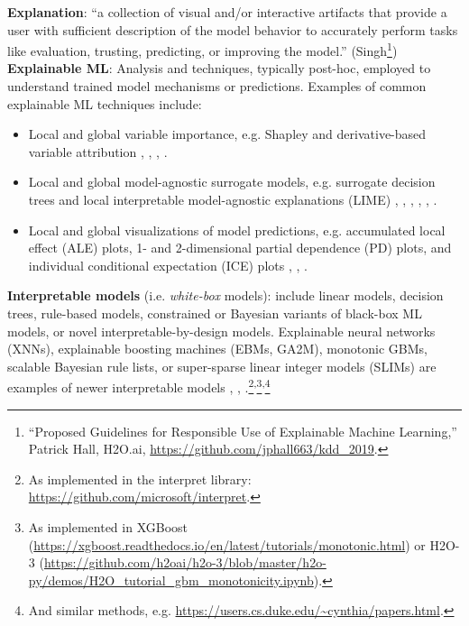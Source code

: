 \documentclass[sigconf]{acmart}
\begin{document}
\vspace{-8pt}
\noindent\textbf{Explanation}: ``a collection of visual and/or interactive artifacts that provide a user with sufficient description of the model behavior to accurately perform tasks like evaluation, trusting, predicting, or improving the model.'' (Singh\footnote{``Proposed Guidelines for Responsible Use of Explainable Machine Learning,'' Patrick Hall, H2O.ai, \url{https://github.com/jphall663/kdd_2019}.})\\

\vspace{-8pt}
\noindent\textbf{Explainable ML}:  Analysis and techniques, typically post-hoc, employed to understand trained model mechanisms or predictions. Examples of common explainable ML techniques include:
\begin{itemize}
\item Local and global variable importance, e.g. Shapley and derivative-based variable attribution \cite{grad_attr} \cite{keinan2004fair}, \cite{shapley}, \cite{shapley1988shapley}, \cite{kononenko2010efficient}.
\item Local and global model-agnostic surrogate models, e.g. surrogate decision trees and local interpretable model-agnostic explanations (LIME) \cite{dt_surrogate2}, \cite{viper}, \cite{dt_surrogate1}, \cite{lime-sup}, \cite{lime}, \cite{wf_xnn}. 
\item Local and global visualizations of model predictions, e.g. accumulated local effect (ALE) plots, 1- and 2-dimensional partial dependence (PD) plots, and individual conditional expectation (ICE) plots \cite{ale_plot}, \cite{esl}, \cite{ice_plots}.
\end{itemize}  

\noindent\textbf{Interpretable models} (i.e. \textit{white-box} models): include linear models, decision trees, rule-based models, constrained or Bayesian variants of black-box ML models, or novel interpretable-by-design models. Explainable neural networks (XNNs), explainable boosting machines (EBMs, GA2M), monotonic GBMs, scalable Bayesian rule lists, or super-sparse linear integer models (SLIMs) are examples of newer interpretable models \cite{slim}, \cite{wf_xnn}, \cite{sbrl}.\footnote{As implemented in the interpret library: \url{https://github.com/microsoft/interpret}.}\textsuperscript{,}\footnote{As implemented in XGBoost (\url{https://xgboost.readthedocs.io/en/latest/tutorials/monotonic.html}) or H2O-3 (\url{https://github.com/h2oai/h2o-3/blob/master/h2o-py/demos/H2O_tutorial_gbm_monotonicity.ipynb}).}\textsuperscript{,}\footnote{And similar methods, e.g. \url{https://users.cs.duke.edu/~cynthia/papers.html}.}\\
\end{document}
